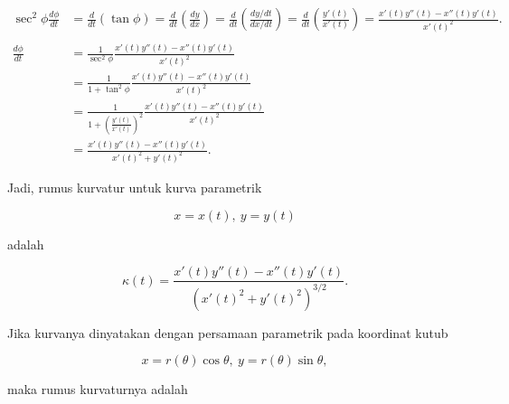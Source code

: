 \documentclass[a4paper,10pt]{article}
\begin{document}
\begin{eulernotebook}
\begin{eulercomment}
\begin{eulercomment}
\begin{eulercomment}
\begin{eulercomment}
\begin{eulercomment}
\begin{eulercomment}
\begin{eulercomment}
\begin{eulercomment}
\begin{eulercomment}
\begin{eulercomment}
\begin{eulercomment}
\begin{eulercomment}
\begin{eulercomment}
\begin{eulercomment}
\begin{eulercomment}
\begin{eulercomment}
\begin{eulercomment}
\end{eulercomment}
\begin{eulerformula}
\[
\begin{aligned}\sec^2\phi\frac{d\phi}{dt} &= \frac{d}{dt}\left(\tan\phi\right)= \frac{d}{dt}\left(\frac{dy}{dx}\right)= \frac{d}{dt}\left(\frac{dy/dt}{dx/dt}\right)= \frac{d}{dt}\left(\frac{y'(t)}{x'(t)}\right)=\frac{x'(t)y''(t)-x''(t)y'(t)}{x'(t)^2}.\\ & \\ \frac{d\phi}{dt} &= \frac{1}{\sec^2\phi}\frac{x'(t)y''(t)-x''(t)y'(t)}{x'(t)^2}\\ &= \frac{1}{1+\tan^2\phi}\frac{x'(t)y''(t)-x''(t)y'(t)}{x'(t)^2}\\ &= \frac{1}{1+\left(\frac{y'(t)}{x'(t)}\right)^2}\frac{x'(t)y''(t)-x''(t)y'(t)}{x'(t)^2}\\ &= \frac{x'(t)y''(t)-x''(t)y'(t)}{x'(t)^2+y'(t)^2}.\end{aligned}
\]
\end{eulerformula}
\begin{eulercomment}
Jadi, rumus kurvatur untuk kurva parametrik

\end{eulercomment}
\begin{eulerformula}
\[
x=x(t),\ y=y(t)
\]
\end{eulerformula}
\begin{eulercomment}
adalah

\end{eulercomment}
\begin{eulerformula}
\[
\kappa(t) = \frac{x'(t)y''(t)-x''(t)y'(t)}{\left(x'(t)^2+y'(t)^2\right)^{3/2}}.
\]
\end{eulerformula}
\begin{eulercomment}
Jika kurvanya dinyatakan dengan persamaan parametrik pada koordinat kutub

\end{eulercomment}
\begin{eulerformula}
\[
x=r(\theta)\cos\theta,\ y=r(\theta)\sin\theta,
\]
\end{eulerformula}
\begin{eulercomment}
maka rumus kurvaturnya adalah


\end{eulercomment}
\end{eulercomment}
\end{eulercomment}
\end{eulercomment}
\end{eulercomment}
\end{eulercomment}
\end{eulercomment}
\end{eulercomment}
\end{eulercomment}
\end{eulercomment}
\end{eulercomment}
\end{eulercomment}
\end{eulercomment}
\end{eulercomment}
\end{eulercomment}
\end{eulercomment}
\end{eulercomment}
\end{eulernotebook}
\end{document}
